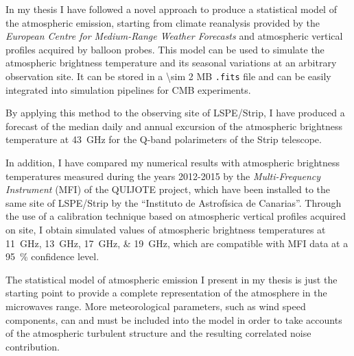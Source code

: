 \documentclass[11pt,letterpaper]{article}
\begin{document}
In my thesis I have followed a novel approach to produce a statistical
model of the atmospheric emission, starting from climate reanalysis
provided by the \emph{European Centre for Medium-Range Weather Forecasts}
and atmospheric vertical profiles acquired by balloon probes. This model
can be used to simulate the atmospheric brightness temperature and its
seasonal variations at an arbitrary observation site. It can be stored in a
\num{\sim 2} MB \texttt{.fits} file and can be easily integrated into
simulation pipelines for CMB experiments.

By applying this method to the observing site of LSPE/Strip, I have
produced a forecast of the median daily and annual excursion of the
atmospheric brightness temperature at \SI{43}{\giga\hertz} for the Q-band
polarimeters of the Strip telescope.

In addition, I have compared my numerical results with atmospheric
brightness temperatures measured during the years 2012-2015 by the
\emph{Multi-Frequency Instrument} (MFI) of the QUIJOTE project, which have
been installed to the same site of LSPE/Strip by the ``Instituto de
Astrof\'isica de Canarias''. Through the use of a calibration technique
based on atmospheric vertical profiles acquired on site, I obtain simulated
values of atmospheric brightness temperatures at
\SIlist{11;13;17;19}{\giga\hertz}, which are compatible with MFI data at a
\SI{95}{\percent} confidence level.

The statistical model of atmospheric emission I present in my thesis is
just the starting point to provide a complete representation of the
atmosphere in the microwaves range. More meteorological parameters, such as
wind speed components, can and must be included into the model in order to
take accounts of the atmospheric turbulent structure and the resulting
correlated noise contribution.
\end{document}
